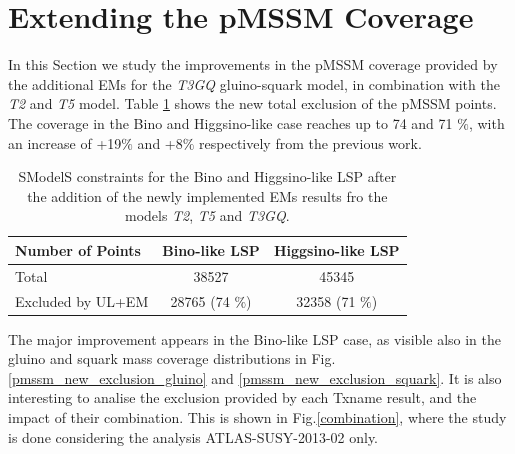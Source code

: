 \documentclass[a4paper,11pt]{article}
\begin{document}
\section{Extending the pMSSM Coverage}\label{sec::impact}
In this Section we study the improvements in the pMSSM coverage provided by the additional EMs for the \textit{T3GQ} gluino-squark model, in combination with the \textit{T2} and \textit{T5} model. Table \ref{Res_Tab_New} shows the new total exclusion of the pMSSM points. The coverage in the Bino and Higgsino-like case reaches up to 74 and 71 $\%$, with an increase of +19$\%$ and +8$\%$ respectively from the previous work. 
%
\begin{table}
\center
\renewcommand{\arraystretch}{1.3}
\begin{tabular}{ l | c   c  }
\textbf{Number of Points} & \textbf{Bino-like LSP }& \textbf{Higgsino-like LSP} \\
\toprule \toprule
Total   & 38527 & 45345 \\
Excluded by UL+EM & 28765 (74 $\%$) & 32358 (71 $\%$) \\ 
\hline
\end{tabular}
\caption{SModelS constraints for the Bino and Higgsino-like LSP after the addition of the newly implemented EMs results fro the models \textit{T2}, \textit{T5} and \textit{T3GQ}.}
\label{Res_Tab_New}
\end{table}
%
The major improvement appears in the Bino-like LSP case, as visible also in the gluino and squark mass coverage distributions in Fig. \ref{pmssm_new_exclusion_gluino} and \ref{pmssm_new_exclusion_squark}. 
%
It is also interesting to analise the exclusion provided by each Txname result, and the impact of their combination. This is shown in Fig.\ref{combination}, where the study is done considering the analysis ATLAS-SUSY-2013-02 only. 
%
\end{document}
